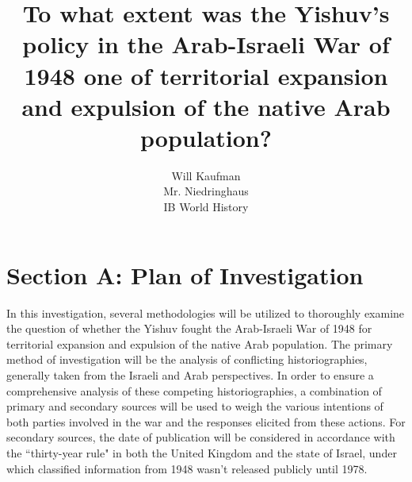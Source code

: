 \documentclass[12pt]{turabian-researchpaper}
\begin{document}
\title{To what extent was the Yishuv's policy in the Arab-Israeli War of 1948 one of territorial expansion and expulsion of the native Arab population?}



\author{Will Kaufman \\ Mr. Niedringhaus \\ IB World History}
\maketitle



\section{Section A: Plan of Investigation}
In this investigation, several methodologies will be utilized to thoroughly examine the question of whether the Yishuv fought the Arab-Israeli War of 1948 for territorial expansion and expulsion of the native Arab population.  The primary method of investigation will be the analysis of conflicting historiographies, generally taken from the Israeli and Arab perspectives.  In order to ensure a comprehensive analysis of these competing historiographies, a combination of primary and secondary sources will be used to weigh the various intentions of both parties involved in the war and the responses elicited from these actions.  For secondary sources, the date of publication will be considered in accordance with the ``thirty-year rule" in both the United Kingdom and the state of Israel, under which classified information from 1948 wasn’t released publicly until 1978.

\end{document}
